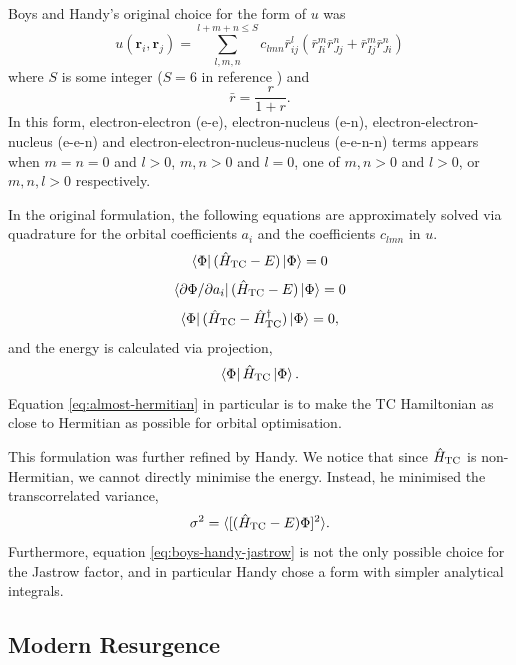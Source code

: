 Boys and Handy's original choice for the form of $u$ was
\begin{equation}
    \label{eq:boys-handy-jastrow}
    u(\bm r_i, \bm r_j) = \sum_{l,m,n}^{l+m+n\leq S} c_{lmn}\bar r_{ij}^l(\bar r_{Ii}^m\bar r_{Jj}^n + \bar r_{Ij}^m\bar r_{Ji}^n)
\end{equation}
where $S$ is some integer ($S=6$ in reference )\supercite{cohenSimilarity2019} and
\begin{equation}
    \bar r = \frac{r}{1+r}.
\end{equation}
In this form, electron-electron (e-e), electron-nucleus (e-n), electron-electron-nucleus (e-e-n) and electron-electron-nucleus-nucleus (e-e-n-n) terms appears when $m=n=0$ and $l>0$, $m,n>0$ and $l=0$, one of $m,n>0$ and $l>0$, or $m,n,l>0$ respectively.

In the original formulation,\supercite{boysCalculation1969} the following equations are approximately solved via quadrature for the orbital coefficients $a_i$ and the coefficients $c_{lmn}$ in $u$.
\begin{equation}
    \bra\Phi(\hat H_\mathrm{TC} - E)\ket\Phi = 0
\end{equation}
\begin{equation}
    \bra{\partial\Phi/\partial a_i}(\hat H_\mathrm{TC} - E)\ket\Phi = 0
\end{equation}
\begin{equation}
    \label{eq:almost-hermitian}
    \bra\Phi(\hat H_\mathrm{TC} - \hat H_\mathrm{TC}^\dag)\ket\Phi = 0,
\end{equation}
and the energy is calculated via projection,
\begin{equation}
    \bra\Phi\hat H_\mathrm{TC}\ket\Phi.
\end{equation}
Equation \ref{eq:almost-hermitian} in particular is to make the TC Hamiltonian as close to Hermitian as possible for orbital optimisation.

This formulation was further refined by Handy.\supercite{handyEnergies1969} We notice that since $\hat H_\mathrm{TC}$ is non-Hermitian, we cannot directly minimise the energy. Instead, he minimised the transcorrelated variance,
\begin{equation}
    \sigma^2 = \langle [(\hat H_\mathrm{TC} - E)\Phi]^2\rangle.
\end{equation}
Furthermore, equation \ref{eq:boys-handy-jastrow} is not the only possible choice for the Jastrow factor, and in particular Handy chose a form with simpler analytical integrals.


\subsection{Modern Resurgence}

